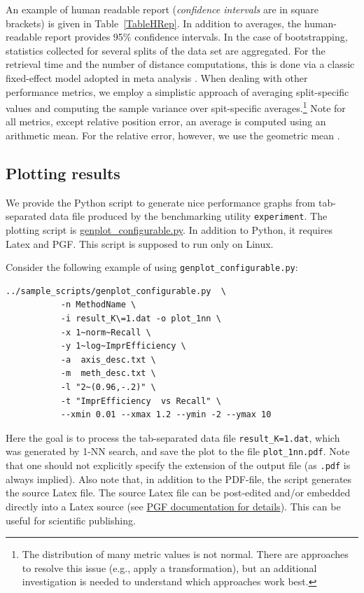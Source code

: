 \documentclass[runningheads,a4paper]{llncs}
\newcommand{\todonoteinline}[1]{\todo[color=red!40,inline,caption={TODO}]{#1}}
\newcommand{\replocfile}{https://github.com/searchivarius/NonMetricSpaceLib/blob/pserv/}
\newcommand{\ttt}[1]{\texttt{#1}}
\begin{document}
{\todonoteinline{Revise computation of confidence intervals}
An example of human readable report (\emph{confidence intervals} are in square brackets)
is given in Table~\ref{TableHRep}.
In addition to averages, the human-readable report provides 95\% confidence intervals.
In the case of bootstrapping, statistics collected for several splits of the data set are aggregated.
For the retrieval time and the number of distance computations,
this is done via a classic fixed-effect model adopted in meta analysis \cite{Hedges_and_Vevea:1998}.
When dealing with other performance metrics, 
we employ a simplistic approach of averaging split-specific values
and computing the sample variance over spit-specific averages.\footnote{The distribution
of many metric values is not normal. There are approaches to resolve this issue (e.g., apply a transformation),
but an additional investigation is needed to understand which approaches work best.}
Note for all metrics, except relative position error, an average is computed using an arithmetic mean.
For the relative error, however, we use the geometric mean  \cite{king:1986}.


\subsection{Plotting results}\label{SectionGenPlot}
We provide the Python script to generate nice performance graphs 
from tab-separated data file produced by the 
benchmarking utility \ttt{experiment}. 
The plotting script is \href{\replocfile sample_scripts/genplot_configurable.py}{genplot\_configurable.py}.
In addition to Python, it requires Latex and PGF. 
This script is supposed to run only on Linux.

Consider the following example of using \ttt{genplot\_configurable.py}:
\begin{verbatim}
../sample_scripts/genplot_configurable.py  \
           -n MethodName \
           -i result_K\=1.dat -o plot_1nn \
           -x 1~norm~Recall \
           -y 1~log~ImprEfficiency \
           -a  axis_desc.txt \
           -m  meth_desc.txt \
           -l "2~(0.96,-.2)" \
           -t "ImprEfficiency  vs Recall" \
           --xmin 0.01 --xmax 1.2 --ymin -2 --ymax 10
\end{verbatim}
Here the goal is to process the tab-separated data file \ttt{result\_K=1.dat},
which was generated by 1-NN search, and save the plot to the file \ttt{plot\_1nn.pdf}.
Note that one should not explicitly specify the extension of the output file (as
\ttt{.pdf} is always implied). Also note that, in addition to the PDF-file,
the script generates the source Latex file. 
The source Latex file can be post-edited and/or embedded directly into a Latex source 
(see \href{http://ftp.fau.de/ctan/graphics/pgf/base/doc/pgfmanual.pdf}{PGF documentation for details}).
This can be useful for scientific publishing.


}
\end{document}
